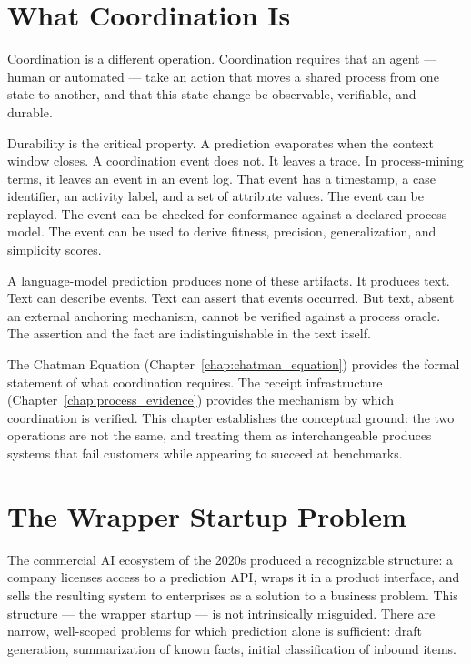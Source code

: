 \section{What Coordination Is}

Coordination is a different operation. Coordination requires that an agent --- human or automated --- take an action that moves a shared process from one state to another, and that this state change be observable, verifiable, and durable.

Durability is the critical property. A prediction evaporates when the context window closes. A coordination event does not. It leaves a trace. In process-mining terms, it leaves an event in an event log. That event has a timestamp, a case identifier, an activity label, and a set of attribute values. The event can be replayed. The event can be checked for conformance against a declared process model. The event can be used to derive fitness, precision, generalization, and simplicity scores.

A language-model prediction produces none of these artifacts. It produces text. Text can describe events. Text can assert that events occurred. But text, absent an external anchoring mechanism, cannot be verified against a process oracle. The assertion and the fact are indistinguishable in the text itself.

The Chatman Equation (Chapter~\ref{chap:chatman_equation}) provides the formal statement of what coordination requires. The receipt infrastructure (Chapter~\ref{chap:process_evidence}) provides the mechanism by which coordination is verified. This chapter establishes the conceptual ground: the two operations are not the same, and treating them as interchangeable produces systems that fail customers while appearing to succeed at benchmarks.

\section{The Wrapper Startup Problem}

The commercial AI ecosystem of the 2020s produced a recognizable structure: a company licenses access to a prediction API, wraps it in a product interface, and sells the resulting system to enterprises as a solution to a business problem. This structure --- the wrapper startup --- is not intrinsically misguided. There are narrow, well-scoped problems for which prediction alone is sufficient: draft generation, summarization of known facts, initial classification of inbound items.

